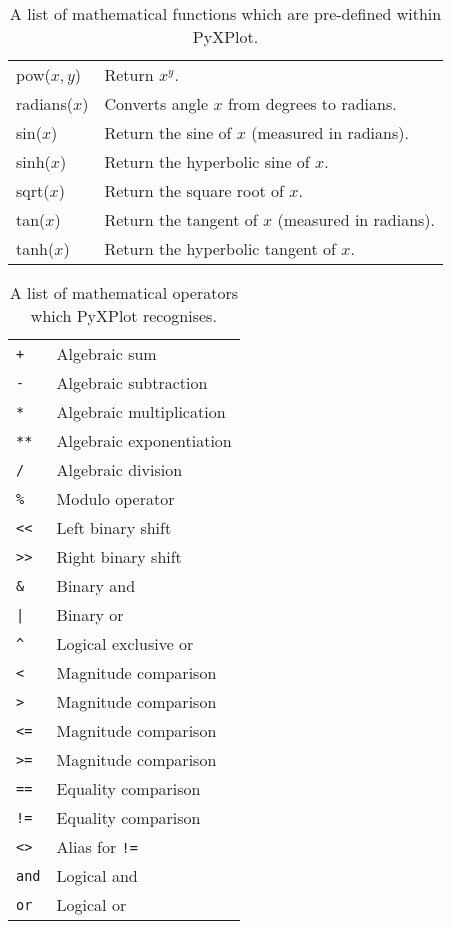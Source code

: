 \documentclass[a4paper,onecolumn,11pt]{book}
\begin{document}
\begin{table}
\begin{longtable}{|lp{8cm}|}
pow($x,y$)&
Return $x^y$.\\
radians($x$)&
Converts angle $x$ from degrees to radians.\\
sin($x$)&
Return the sine of $x$ (measured in radians).\\
sinh($x$)&
Return the hyperbolic sine of $x$.\\
sqrt($x$)&
Return the square root of $x$.\\
tan($x$)&
Return the tangent of $x$ (measured in radians).\\
tanh($x$)&
Return the hyperbolic tangent of $x$.\\
\hline
\end{longtable}
\caption{A list of mathematical functions which are pre-defined within PyXPlot.}
\label{functions_table}
\end{table}

\begin{table}
\begin{longtable}{|lp{8cm}|}
\hline
\texttt{+} & Algebraic sum \\
\texttt{-} & Algebraic subtraction \\
\texttt{*} & Algebraic multiplication \\
\texttt{**} & Algebraic exponentiation \\
\texttt{/} & Algebraic division \\
\texttt{\%} & Modulo operator \\
\texttt{<<} & Left binary shift \\
\texttt{>>} & Right binary shift \\
\texttt{\&} & Binary and \\
\texttt{|} & Binary or \\
\texttt{\^{}} & Logical exclusive or \\
\texttt{<} & Magnitude comparison \\
\texttt{>} & Magnitude comparison \\
\texttt{<=} & Magnitude comparison \\
\texttt{>=} & Magnitude comparison \\
\texttt{==} & Equality comparison \\
\texttt{!=} & Equality comparison \\
\texttt{<>} & Alias for \texttt{!=} \\
\texttt{and} & Logical and \\
\texttt{or} & Logical or \\
\hline
\end{longtable}
\caption{A list of mathematical operators which PyXPlot recognises.}
\label{operators_table}
\end{table}
\end{document}

